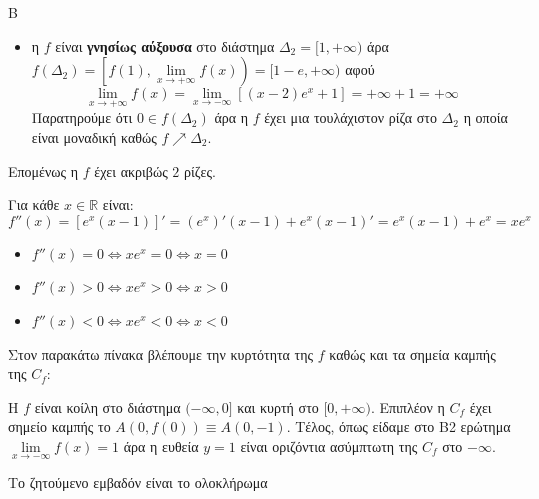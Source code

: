 \begin{thema}{Β}
\begin{erwthma}
\begin{itemize}
\item η $f$ είναι \textbf{γνησίως αύξουσα} στο διάστημα $\varDelta_2=[1,+\infty)$ άρα $f(\varDelta_2)=\left[f(1),\lim\limits_{x\to +\infty}{f(x)}\right)=[1-e,+\infty)$ αφού
\[\lim\limits_{x\to+\infty}{f(x)}=\lim\limits_{x\to -\infty}{\left[(x-2)e^x+1\right]}=+\infty+1=+\infty\]
Παρατηρούμε ότι $0\in f(\varDelta_2)$ άρα η $f$ έχει μια τουλάχιστον ρίζα στο $\varDelta_2$ η οποία είναι μοναδική καθώς $f\nearrow\varDelta_2$.
\end{itemize}
Επομένως η $f$ έχει ακριβώς $2$ ρίζες.
\item Για κάθε $x\in\mathbb{R}$ είναι:
\[f''(x)=\left[e^x(x-1)\right]'=(e^x)'(x-1)+e^x(x-1)'=e^x(x-1)+e^x=xe^x\]
\begin{itemize}
\item $f''(x)=0\Leftrightarrow xe^x=0\Leftrightarrow x=0$
\item $f''(x)>0\Leftrightarrow xe^x>0\Leftrightarrow x>0$
\item $f''(x)<0\Leftrightarrow xe^x<0\Leftrightarrow x<0$
\end{itemize}
Στον παρακάτω πίνακα βλέπουμε την κυρτότητα της $f$ καθώς και τα σημεία καμπής της $C_f$:
\begin{center}
\end{center}
H $f$ είναι κοίλη στο διάστημα $(-\infty,0]$ και κυρτή στο $[0,+\infty)$. Επιπλέον η $C_f$ έχει σημείο καμπής το $A(0,f(0))\equiv A(0,-1)$. Τέλος, όπως είδαμε στο Β2 ερώτημα $\lim\limits_{x\to-\infty}{f(x)}=1$ άρα η ευθεία $y=1$ είναι οριζόντια ασύμπτωτη της $C_f$ στο $-\infty$.
\item Το ζητούμενο εμβαδόν είναι το ολοκλήρωμα


\end{erwthma}
\end{thema}
